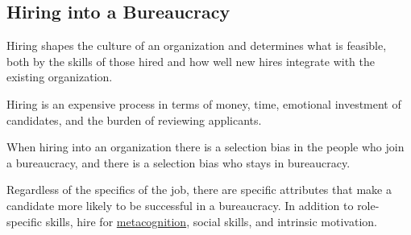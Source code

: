 \subsection{Hiring into a Bureaucracy}


Hiring shapes the culture of an organization and determines what is feasible, both by the skills of those hired and how well new hires integrate with the existing organization. 

Hiring is an expensive process in terms of money, time, emotional investment of candidates, and the burden of reviewing applicants. 

When hiring into an organization there is a selection bias in the people who join a bureaucracy, and there is a selection bias who stays in bureaucracy. 


Regardless of the specifics of the job, there are specific attributes that make a candidate more likely to be successful in a bureaucracy. In addition to role-specific skills, hire for \href{https://en.wikipedia.org/wiki/Metacognition}{metacognition}, social skills, and intrinsic motivation.




